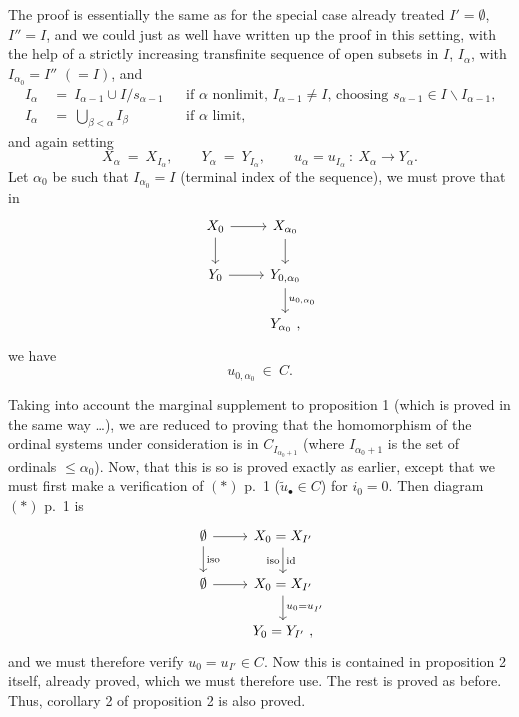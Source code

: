 \documentclass[11pt]{article}
\newcommand{\printedpage}[1]{\marginpar{\footnotesize p.~#1}}
\newcommand{\msp}[1]{\marginpar{\footnotesize [#1]}}
\begin{document}
\msp{page 21}
The proof is essentially the same as for the special case already treated $I' = \emptyset$, $I'' = I$, and we could just as well have written up the proof in this setting, with the help of a strictly increasing transfinite sequence of open subsets in $I$, $I_\alpha$, with  $I_{\alpha_0} = I''$ $(= I)$, and
\[
\begin{aligned}
I_\alpha \ &= \ I_{\alpha-1} \cup I/s_{\alpha-1} && \text{if $\alpha$ nonlimit, $I_{\alpha-1} \neq I$, choosing $s_{\alpha-1} \in I \backslash I_{\alpha-1}$,} \\
I_\alpha \ &= \ \textstyle\bigcup_{\beta<\alpha} I_\beta && \text{if $\alpha$ limit,}
\end{aligned}
\]
and again setting
\[
X_\alpha \ = \ X_{I_\alpha}, \qquad Y_\alpha \ = \ Y_{I_\alpha}, \qquad u_\alpha = u_{I_\alpha} \ : \ X_\alpha \longrightarrow Y_\alpha.
\]
Let $\alpha_0$ be such that $I_{\alpha_0} = I$ (terminal index of the sequence), we must prove that in
\[
\begin{tikzcd}
X_0 \arrow[r] \arrow[d] & X_{\alpha_0} \arrow[d] \\
Y_0 \arrow[r] & Y_{0,\alpha_0} \arrow[d, "u_{0,\alpha_0}"] \\
 & Y_{\alpha_0}\ ,
\end{tikzcd}
\]
\printedpage{13}
\msp{page 22} we have
\[
u_{0,\alpha_0} \ \in \ C.
\]

Taking into account the marginal supplement to proposition 1 (which is proved in the same way \ldots), we are reduced to proving that the homomorphism of the ordinal systems under consideration is in $C_{I_{\alpha_0+1}}$ (where $I_{\alpha_0+1}$ is the set of ordinals $\leq \alpha_0$). Now, that this is so is proved exactly as earlier, except that we must first make a verification of $(*)$ p.~1 ($\tilde{u}_\bullet \in C$) for $i_0 = 0$. Then diagram $(*)$ p.~1 is
\[
\begin{tikzcd}
\emptyset \arrow[r] \arrow[d, "\mathrm{iso}"] & X_0 = X_{I'} \arrow[d, "\mathrm{iso}"', "\mathrm{id}"] \\
\emptyset \arrow[r] & X_0 = X_{I'} \arrow[d, "u_0 = u_{I'}"] \\
 & Y_0 = Y_{I'}\ ,
\end{tikzcd}
\]
and we must therefore verify $u_0 = u_{I'} \in C$. Now this is contained in proposition 2 itself, already proved, which we must therefore use. %
The rest is proved as before. Thus, corollary 2 of proposition 2 is also proved.
\end{document}
